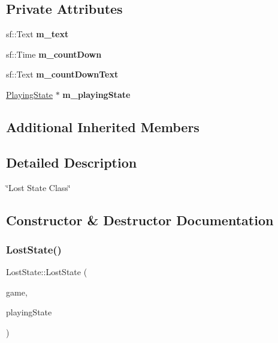 \subsection*{Private Attributes}
\begin{DoxyCompactItemize}
\item 
\mbox{\label{classLostState_adc3ca51b5586bcf492cfbadb4019eca1}} 
sf\+::\+Text {\bfseries m\+\_\+text}
\item 
\mbox{\label{classLostState_a7592a0a1cc8aeb75aaa6034d00a71e1c}} 
sf\+::\+Time {\bfseries m\+\_\+count\+Down}
\item 
\mbox{\label{classLostState_ac57c561a1bef734c2d4f10f45ec8d024}} 
sf\+::\+Text {\bfseries m\+\_\+count\+Down\+Text}
\item 
\mbox{\label{classLostState_afbf2bb0267880b042616c847a6b5a950}} 
\hyperlink{classPlayingState}{Playing\+State} $\ast$ {\bfseries m\+\_\+playing\+State}
\end{DoxyCompactItemize}
\subsection*{Additional Inherited Members}


\subsection{Detailed Description}
\char`\"{}\+Lost State Class\char`\"{} 

\subsection{Constructor \& Destructor Documentation}
\mbox{\label{classLostState_a48e846ea945ff11f7bda00e71a0cfd7d}} 
\subsubsection{\texorpdfstring{Lost\+State()}{LostState()}}
{\footnotesize\ttfamily Lost\+State\+::\+Lost\+State (\begin{DoxyParamCaption}\item[{\hyperlink{classGame}{Game} $\ast$}]{game,  }\item[{\hyperlink{classGameState}{Game\+State} $\ast$}]{playing\+State }\end{DoxyParamCaption})}




